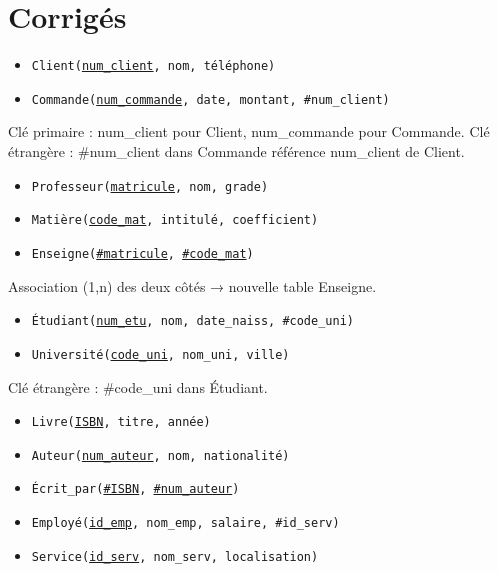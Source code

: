 \section{Corrigés}

\begin{itemize}
    \item \texttt{Client(\underline{num\_client}, nom, téléphone)}
    \item \texttt{Commande(\underline{num\_commande}, date, montant, \#num\_client)}
\end{itemize}
Clé primaire : num\_client pour Client, num\_commande pour Commande. Clé étrangère : \#num\_client dans Commande référence num\_client de Client.

\begin{itemize}
    \item \texttt{Professeur(\underline{matricule}, nom, grade)}
    \item \texttt{Matière(\underline{code\_mat}, intitulé, coefficient)}
    \item \texttt{Enseigne(\underline{\#matricule}, \underline{\#code\_mat})}
\end{itemize}
Association (1,n) des deux côtés → nouvelle table Enseigne.

\begin{itemize}
    \item \texttt{Étudiant(\underline{num\_etu}, nom, date\_naiss, \#code\_uni)}
    \item \texttt{Université(\underline{code\_uni}, nom\_uni, ville)}
\end{itemize}
Clé étrangère : \#code\_uni dans Étudiant.

\begin{itemize}
    \item \texttt{Livre(\underline{ISBN}, titre, année)}
    \item \texttt{Auteur(\underline{num\_auteur}, nom, nationalité)}
    \item \texttt{Écrit\_par(\underline{\#ISBN}, \underline{\#num\_auteur})}
\end{itemize}

\begin{itemize}
    \item \texttt{Employé(\underline{id\_emp}, nom\_emp, salaire, \#id\_serv)}
    \item \texttt{Service(\underline{id\_serv}, nom\_serv, localisation)}
\end{itemize}

